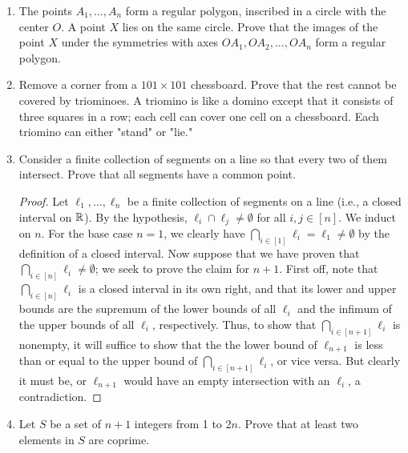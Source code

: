 \documentclass[../main.tex]{subfiles}
\begin{document}
\begin{enumerate}
\begin{proof}
    \end{proof}
    \item The points $A_1,\dots,A_n$ form a regular polygon, inscribed in a circle with the center $O$. A point $X$ lies on the same circle. Prove that the images of the point $X$ under the symmetries with axes $OA_1,OA_2,\dots,OA_n$ form a regular polygon.
    \item Remove a corner from a $101\times 101$ chessboard. Prove that the rest cannot be covered by triominoes. A triomino is like a domino except that it consists of three squares in a row; each cell can cover one cell on a chessboard. Each triomino can either "stand" or "lie."
    \item Consider a finite collection of segments on a line so that every two of them intersect. Prove that all segments have a common point.
    \begin{proof}
        Let $\ell_1,\dots,\ell_n$ be a finite collection of segments on a line (i.e., a closed interval on $\mathbb{R}$). By the hypothesis, $\ell_i\cap\ell_j\neq\emptyset$ for all $i,j\in[n]$. We induct on $n$. For the base case $n=1$, we clearly have $\bigcap_{i\in[1]}\ell_i=\ell_1\neq\emptyset$ by the definition of a closed interval. Now suppose that we have proven that $\bigcap_{i\in[n]}\ell_i\neq\emptyset$; we seek to prove the claim for $n+1$. First off, note that $\bigcap_{i\in[n]}\ell_i$ is a closed interval in its own right, and that its lower and upper bounds are the supremum of the lower bounds of all $\ell_i$ and the infimum of the upper bounds of all $\ell_i$, respectively. Thus, to show that $\bigcap_{i\in[n+1]}\ell_i$ is nonempty, it will suffice to show that the the lower bound of $\ell_{n+1}$ is less than or equal to the upper bound of $\bigcap_{i\in[n+1]}\ell_i$, or vice versa. But clearly it must be, or $\ell_{n+1}$ would have an empty intersection with an $\ell_i$, a contradiction.
    \end{proof}
    \item Let $S$ be a set of $n+1$ integers from 1 to $2n$. Prove that at least two elements in $S$ are coprime.
\end{enumerate}
\end{document}
